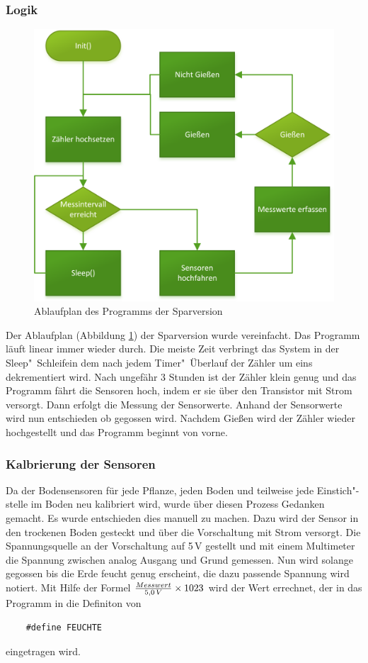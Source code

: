 	\subsubsection{Logik}
		\begin{figure}[!t]
	\centering
	\includegraphics[width=0.8\linewidth]{Diagramme/SV_Ablaufdiagramm.png}
	\caption{Ablaufplan des Programms der Sparversion}
	\label{fig-SV_Ablaufplan}
\end{figure}

	Der Ablaufplan (Abbildung \ref{fig-SV_Ablaufplan}) der Sparversion wurde vereinfacht. Das Programm läuft linear immer wieder durch.
	Die meiste Zeit verbringt das System in der \glqq Sleep"~Schleife\grqq in dem nach jedem Timer"~Überlauf der Zähler um eins dekrementiert wird.
	Nach ungefähr 3 Stunden ist der Zähler klein genug und das Programm fährt die Sensoren hoch, indem er sie über den Transistor mit Strom versorgt.
	Dann erfolgt die Messung der Sensorwerte.
	Anhand der Sensorwerte wird nun entschieden ob gegossen wird.
	Nachdem Gießen wird der Zähler wieder hochgestellt und das Programm beginnt von vorne.
	\subsubsection{Kalbrierung der Sensoren}
	Da der Bodensensoren für jede Pflanze, jeden Boden und teilweise jede Einstich"-stelle im Boden neu kalibriert wird, wurde über diesen Prozess Gedanken gemacht.
	Es wurde entschieden dies manuell zu machen. 
	Dazu wird der Sensor in den trockenen Boden gesteckt und über die Vorschaltung mit Strom versorgt.
	Die Spannungsquelle an der Vorschaltung auf 5\,V gestellt und mit einem Multimeter die Spannung zwischen analog Ausgang und Grund gemessen.
	Nun wird solange gegossen bis die Erde feucht genug erscheint, die dazu passende Spannung wird notiert.
	Mit Hilfe der Formel \begin{math} {Messwert \over 5,0\,V} \times 1023 \end{math} wird der Wert errechnet, der in das Programm in die Definiton von 
	\begin{verbatim}
	#define FEUCHTE	
	\end{verbatim} 
	eingetragen wird.
	
